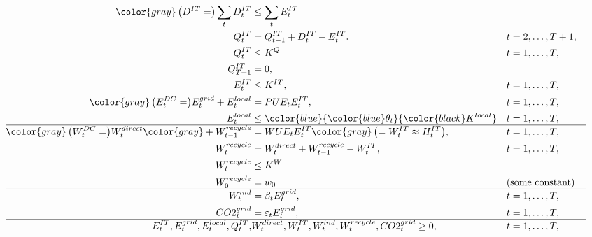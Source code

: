 \documentclass{article}
\begin{document}
\begin{align}
    {\color{gray}\left(D^{IT}=\right)}\sum_{t}D^{IT}_t &\leq  \sum_t E_t^{IT}\\
    Q_{t}^{IT} &= Q_{t-1}^{IT} + D_t^{IT} - E_t^{IT}. &&  t=2,\ldots,T+1,\\ 
    Q_t^{IT} & \leq K^Q  && t=1,\ldots,T,\\
    Q_{T+1}^{IT} &= 0,\\
     E_t^{IT}& \leq K^{IT}, && t=1,\ldots,T, \\
    {\color{gray}\left(E_t^{DC}=\right)}E_t^{grid} + E_t^{local}  &= PUE_t E_t^{IT}, && t=1,\ldots,T, \\
    E_t^{local} &\leq \color{blue}{\color{blue}\theta_t} {\color{black}K^{local}}  && t=1,\ldots,T,\\
  \hline {\color{gray}\left(W_t^{DC}=\right)}  W_t^{direct} {\color{gray} + W_{t-1}^{recycle}} &= WUE_t E_t^{IT} {\color{gray} \left(=W_t^{IT}\approx H_t^{IT}\right)}, && t=1,\ldots,T, \\
        W^{recycle}_{t} &= W_t^{direct} + W_{t-1}^{recycle} - W_t^{IT},  && t=1,\ldots,T,  \\
        W^{recycle}_{t} &\leq K^{W}\\
        W_0^{recycle}&=w_0 && \text{(some constant)}\\
    \hline
    W_t^{ind} &= \beta_t E_t^{grid}, && t=1,\ldots,T, \\
    CO2_t^{grid} &= \varepsilon_t E_t^{grid} , && t=1,\ldots,T, \\
    \hline
E_t^{IT},E_t^{grid},E_t^{local},Q_t^{IT},&W_t^{direct},W_t^{IT},W_t^{ind},W_t^{recycle},CO2_t^{grid} \geq 0, && t=1,\ldots,T, 
\end{align}
\end{document}
